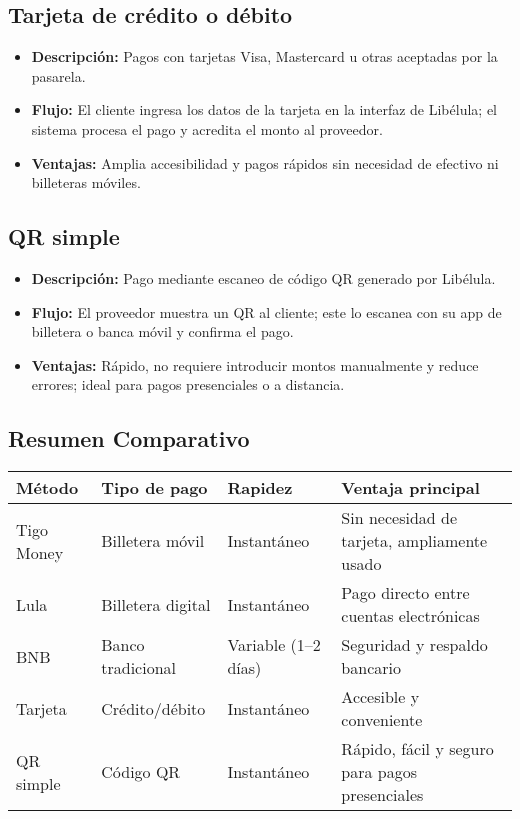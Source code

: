 	\subsection{Tarjeta de crédito o débito}
		\begin{itemize}
			\item \textbf{Descripción:} Pagos con tarjetas Visa, Mastercard u otras aceptadas por la pasarela.
			\item \textbf{Flujo:} El cliente ingresa los datos de la tarjeta en la interfaz de Libélula; el sistema procesa el pago y acredita el monto al proveedor.
			\item \textbf{Ventajas:} Amplia accesibilidad y pagos rápidos sin necesidad de efectivo ni billeteras móviles.
		\end{itemize}

	\subsection{QR simple}
		\begin{itemize}
			\item \textbf{Descripción:} Pago mediante escaneo de código QR generado por Libélula.
			\item \textbf{Flujo:} El proveedor muestra un QR al cliente; este lo escanea con su app de billetera o banca móvil y confirma el pago.
			\item \textbf{Ventajas:} Rápido, no requiere introducir montos manualmente y reduce errores; ideal para pagos presenciales o a distancia.
		\end{itemize}

		\subsection*{Resumen Comparativo}
			\begin{center}
				\begin{tabular}{>{\raggedright}p{3.5cm} p{3cm} p{3cm} p{5cm}}
					\toprule
					\textbf{Método} & \textbf{Tipo de pago} & \textbf{Rapidez} & \textbf{Ventaja principal} \\
					\midrule
					Tigo Money & Billetera móvil & Instantáneo & Sin necesidad de tarjeta, ampliamente usado \\
					Lula & Billetera digital & Instantáneo & Pago directo entre cuentas electrónicas \\
					BNB & Banco tradicional & Variable (1--2 días) & Seguridad y respaldo bancario \\
					Tarjeta & Crédito/débito & Instantáneo & Accesible y conveniente \\
					QR simple & Código QR & Instantáneo & Rápido, fácil y seguro para pagos presenciales \\
					\bottomrule
				\end{tabular}
			\end{center}